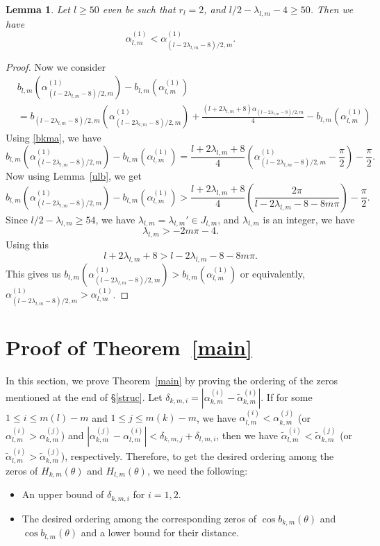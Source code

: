 \documentclass[12pt,reqno]{amsart}
\newtheorem{lem}{Lemma}
\newcommand{\thmref}[1]{Theorem~\ref{#1}}
\newcommand{\lemref}[1]{Lemma~\ref{#1}}
\begin{document}
\begin{lem}\label{k>lam}
Let $l\ge 50$ even be such that $r_l=2$, and $l/2-\lambda_{l,m}-4\ge50$.
Then we have 
$$
\alpha_{l,m}^{(1)}<\alpha_{(l-2\lambda_{l,m}-8)/2,m}^{(1)}.
$$
\end{lem}
\begin{proof}



Now we consider
\begin{align*}
    &b_{l,m}(\alpha_{(l-2\lambda_{l,m}-8)/2,m}^{(1)})-b_{l,m}(\alpha_{l,m}^{(1)})\\
    &=b_{(l-2\lambda_{l,m}-8)/2,m}(\alpha_{(l-2\lambda_{l,m}-8)/2,m}^{(1)})+\frac{(l+2\lambda_{l,m}+8)\alpha_{(l-2\lambda_{l,m}-8)/2,m}}{4}-b_{l,m}(\alpha_{l,m}^{(1)})
    \end{align*}
    Using \eqref{bkma}, we have
    $$
   b_{l,m}(\alpha_{(l-2\lambda_{l,m}-8)/2,m}^{(1)})-b_{l,m}(\alpha_{l,m}^{(1)}) =\frac{l+2\lambda_{l,m}+8}{4}\left(\alpha_{(l-2\lambda_{l,m}-8)/2,m}^{(1)}-\frac{\pi}{2}\right)
-\frac{\pi}{2}.
$$
Now using \lemref{ulb}, we get
\begin{equation}\label{k<l/2}
b_{l,m}(\alpha_{(l-2\lambda_{l,m}-8)/2,m}^{(1)})-b_{l,m}(\alpha_{l,m}^{(1)})>\frac{l+2\lambda_{l,m}+8}{4}\left(\frac{2\pi}{l-2\lambda_{l,m}-8-8m\pi}\right)-\frac{\pi}{2}.
\end{equation}
Since $l/2-\lambda_{l,m}\ge54$, we have $\lambda_{l,m}=\lambda_{l,m}'\in J_{l,m}$, and $\lambda_{l,m}$ is an integer, we have
$$
\lambda_{l,m}>-2m\pi-4.
$$
Using this
$$
l+2\lambda_{l,m}+8>l-2\lambda_{l,m}-8-8m\pi.
$$
This gives us $b_{l,m}(\alpha_{(l-2\lambda_{l,m}-8)/2,m}^{(1)})>b_{l,m}(\alpha_{l,m}^{(1)})$ or equivalently,
$\alpha_{(l-2\lambda_{l,m}-8)/2,m}^{(1)}>\alpha_{l,m}^{(1)}$.
\end{proof}

\section{Proof of \thmref{main}}\label{pmain}
In this section, we prove \thmref{main} by proving the ordering of the zeros mentioned at the end of \S\ref{struc}.
Let $\delta_{k,m,i}=|\alpha_{k,m}^{(i)}-\tilde\alpha_{k,m}^{(i)}|$. If for some $1\le i\le m(l)-m$ and $1\le j\le m(k)-m$, we have $\alpha_{l,m}^{(i)}<\alpha_{k,m}^{(j)}$ (or $\alpha_{l,m}^{(i)}>\alpha_{k,m}^{(j)}$)  and $|\alpha_{k,m}^{(j)}-\alpha_{l,m}^{(i)}|<\delta_{k,m,j}+\delta_{l,m,i}$, then we have $\tilde\alpha_{l,m}^{(i)}<\tilde\alpha_{k,m}^{(j)}$ (or 
$\tilde\alpha_{l,m}^{(i)}>\tilde\alpha_{k,m}^{(j)}$), respectively. Therefore, to get the desired ordering among the zeros of 
$H_{k,m}(\theta)$ and $H_{l,m}(\theta)$, we need the following:
\begin{itemize}
\item An upper bound of $\delta_{k,m,i}$ for $i=1,2$.
\item The desired ordering among the corresponding zeros of $\cos b_{k,m}(\theta)$ and $\cos b_{l,m}(\theta)$ and a lower bound 
for their distance.
\end{itemize}
\end{document}
